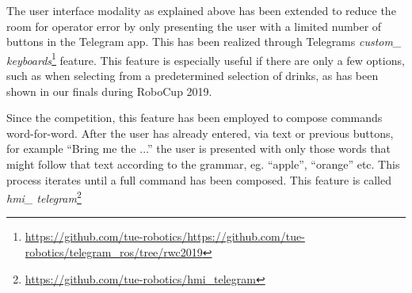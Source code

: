 \label{ssec:keyboard}
The user interface modality as explained above has been extended to reduce the room for operator error by only presenting the user with a limited number of buttons in the Telegram app. This has been realized through Telegrams \emph{custom\_ keyboards}\footnote{\url{https://github.com/tue-robotics/https://github.com/tue-robotics/telegram_ros/tree/rwc2019}} feature. This feature is especially useful if there are only a few options, such as when selecting from a predetermined selection of drinks, as has been shown in our finals during RoboCup 2019.

Since the competition, this feature has been employed to compose commands word-for-word. After the user has already entered, via text or previous buttons, for example “Bring me the ...” the user is presented with only those words that might follow that text according to the grammar, eg. “apple”, “orange” etc. This process iterates until a full command has been composed. This feature is called \emph{hmi\_ telegram}\footnote{\url{https://github.com/tue-robotics/hmi_telegram}}